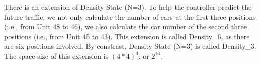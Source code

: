 There is an extension of Density State (N=3). To help the controller predict the future traffic, we not only calculate the number of cars at the first three positions (i.e., from Unit 48 to 46), we also calculate the car number of the second three positions (i.e., from Unit 45 to 43). This extension is called Density\_6, as there are six positions involved. By constrast, Density State (N=3) is called Density\_3. The space size of this extension is $(4 * 4) ^{4}$, or $2^{16}$.